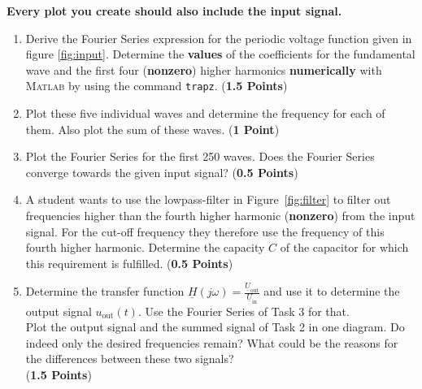 \documentclass[a4paper]{article}
\begin{document}
\textbf{Every plot you create should also include the input signal.}
	\begin{enumerate}
		\item Derive the Fourier Series expression for the periodic voltage function given in figure \ref{fig:input}. Determine the \textbf{values} of the coefficients for the fundamental wave and the first four (\textbf{nonzero}) higher harmonics \textbf{numerically} with \textsc{Matlab} by using the command \texttt{trapz}.
		 (\textbf{1.5 Points})
		 
		\item Plot these five individual waves and determine the frequency for each of them. Also plot the sum of these waves. (\textbf{1 Point})
		
		\item Plot the Fourier Series for the first 250 waves. Does the Fourier Series converge towards the given input signal? (\textbf{0.5 Points})
		
		\item A student wants to use the lowpass-filter in Figure~\ref{fig:filter} to filter out frequencies higher than the fourth higher harmonic (\textbf{nonzero}) from the input signal. For the cut-off frequency they therefore use the frequency of this fourth higher harmonic. Determine the capacity $C$ of the capacitor for which this requirement is fulfilled. (\textbf{0.5 Points})
		
		\item Determine the transfer function $\underline{H}(j\omega) = \frac{\underline{U}_\text{out}}{\underline{U}_\text{in}}$ and use it to determine the output signal $u_\text{out}(t)$. Use the Fourier Series of Task 3 for that. \\
		Plot the output signal and the summed signal of Task 2 in one diagram. Do indeed only the desired frequencies remain? What could be the reasons for the differences between these two signals?\\ (\textbf{1.5 Points})
	\end{enumerate}
\end{document}
